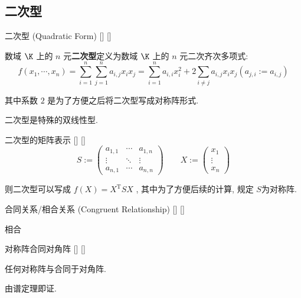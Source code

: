 \documentclass[UTF8]{ctexart}
\begin{document}
	\subsection{二次型}
	
		\begin{dfn}
			[]
			{二次型 (Quadratic Form)}
			[]
			[]
  
			数域 $\K$ 上的 $n$ 元\textbf{二次型}定义为数域 $\K$ 上的 $n$ 元二次齐次多项式: 
                \[ f(x_1,\cdots,x_n)=\sum_{i = 1}^{n} \sum_{j = 1}^{n}a_{i,j}x_i x_j
                = \sum_{i = 1}^n a_{i,i}x_i^2 + 2\sum_{i\neq j} a_{i,j}x_i x_j
			(a_{j,i}:=a_{i,j})\]

                其中系数 $2$ 是为了方便之后将二次型写成对称阵形式. 
                
                二次型是特殊的双线性型. 
		\end{dfn}

		\begin{ppt}
			[]
			{二次型的矩阵表示}
			[]
			[]
			\[ S:=
                \begin{pmatrix}
		          a_{1,1} & \cdots & a_{1,n}\\
                    \vdots & \ddots & \vdots\\
                    a_{n,1} & \cdots & a_{n,n}
			\end{pmatrix}
                \qquad
                X:=
                \begin{pmatrix}
		          x_1\\
                    \vdots\\
                    x_n
			\end{pmatrix}
			\]
   
			则二次型可以写成 $f(X)=X^\mathrm{T}SX$ , 其中为了方便后续的计算, 规定 $S$为对称阵. 
		\end{ppt}

		\begin{dfn}
			[]
			{合同关系/相合关系 (Congruent Relationship)}
			[]
			[]

			{}
			{相合}
			{}
			{}
		\end{dfn}

		\begin{ppt}
			[]
			{对称阵合同对角阵}
			[]
			[]
			
            任何对称阵与合同于对角阵. 
		\end{ppt}

		\begin{prf}
            由谱定理即证. 
        \end{prf}
		
\end{document}
